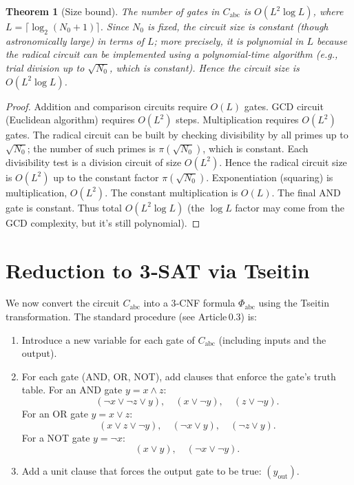 \documentclass[11pt,a4paper]{article}
\newtheorem{theorem}{Theorem}[section]
\begin{document}
\begin{theorem}[Size bound]\label{thm:size}
The number of gates in $C_{\text{abc}}$ is $O(L^2 \log L)$, where $L = \lceil \log_2(N_0+1)\rceil$. Since $N_0$ is fixed, the circuit size is constant (though astronomically large) in terms of $L$; more precisely, it is polynomial in $L$ because the radical circuit can be implemented using a polynomial‑time algorithm (e.g., trial division up to $\sqrt{N_0}$, which is constant). Hence the circuit size is $O(L^2 \log L)$.
\end{theorem}
\begin{proof}
Addition and comparison circuits require $O(L)$ gates. GCD circuit (Euclidean algorithm) requires $O(L^2)$ steps. Multiplication requires $O(L^2)$ gates. The radical circuit can be built by checking divisibility by all primes up to $\sqrt{N_0}$; the number of such primes is $\pi(\sqrt{N_0})$, which is constant. Each divisibility test is a division circuit of size $O(L^2)$. Hence the radical circuit size is $O(L^2)$ up to the constant factor $\pi(\sqrt{N_0})$. Exponentiation (squaring) is multiplication, $O(L^2)$. The constant multiplication is $O(L)$. The final AND gate is constant. Thus total $O(L^2 \log L)$ (the $\log L$ factor may come from the GCD complexity, but it's still polynomial).
\end{proof}

\section{Reduction to 3‑SAT via Tseitin}

We now convert the circuit $C_{\text{abc}}$ into a 3‑CNF formula $\Phi_{\text{abc}}$ using the Tseitin transformation. The standard procedure (see Article 0.3) is:

\begin{enumerate}
\item Introduce a new variable for each gate of $C_{\text{abc}}$ (including inputs and the output).
\item For each gate (AND, OR, NOT), add clauses that enforce the gate’s truth table. For an AND gate $y = x \land z$:
   \[
   (\neg x \lor \neg z \lor y),\quad (x \lor \neg y),\quad (z \lor \neg y).
   \]
   For an OR gate $y = x \lor z$:
   \[
   (x \lor z \lor \neg y),\quad (\neg x \lor y),\quad (\neg z \lor y).
   \]
   For a NOT gate $y = \neg x$:
   \[
   (x \lor y),\quad (\neg x \lor \neg y).
   \]
\item Add a unit clause that forces the output gate to be true: $(y_{\text{out}})$.
\end{enumerate}
\end{document}
